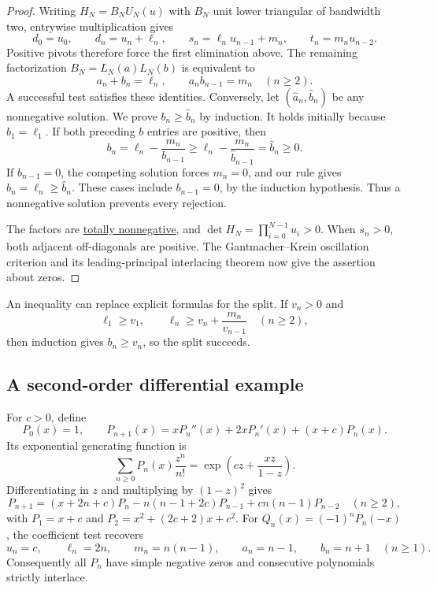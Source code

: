 \begin{proof}
Writing $H_N=B_NU_N(u)$ with $B_N$ unit lower triangular of bandwidth two,
entrywise multiplication gives
\[
 d_0=u_0,\qquad d_n=u_n+\ell_n,\qquad
 s_n=\ell_nu_{n-1}+m_n,\qquad t_n=m_nu_{n-2}.
\]
Positive pivots therefore force the first elimination above.
The remaining factorization $B_N=L_N(a)L_N(b)$ is equivalent to
\[
 a_n+b_n=\ell_n,\qquad a_nb_{n-1}=m_n\quad(n\geq2).
\]
A successful test satisfies these identities. Conversely, let
$(\widehat a_n,\widehat b_n)$ be any nonnegative solution.
We prove $b_n\geq\widehat b_n$ by induction. It holds initially because
$b_1=\ell_1$. If both preceding $b$ entries are positive, then
\[
 b_n=\ell_n-\frac{m_n}{b_{n-1}}
 \geq\ell_n-\frac{m_n}{\widehat b_{n-1}}=\widehat b_n\geq0.
\]
If $\widehat b_{n-1}=0$, the competing solution forces $m_n=0$,
and our rule gives $b_n=\ell_n\geq\widehat b_n$.
These cases include $b_{n-1}=0$, by the induction hypothesis.
Thus a nonnegative solution prevents every rejection.

The factors are \hyperref[totallyNonnegative]{totally nonnegative}, and
$\det H_N=\prod_{i=0}^{N-1}u_i>0$.
When $s_n>0$, both adjacent off-diagonals are positive. The
Gantmacher--Krein oscillation criterion and its leading-principal
interlacing theorem now give the assertion about zeros.
\end{proof}

An inequality can replace explicit formulas for the split. If $v_n>0$ and
\[
 \ell_1\geq v_1,\qquad
 \ell_n\geq v_n+\frac{m_n}{v_{n-1}}\quad(n\geq2),
\]
then induction gives $b_n\geq v_n$, so the split succeeds.

\subsection[interlacingSecondDerivativeExample]{A second-order differential example}

For $c>0$, define
\[
 P_0(x)=1,\qquad P_{n+1}(x)=xP_n''(x)+2xP_n'(x)+(x+c)P_n(x).
\]
Its exponential generating function is
\[
 \sum_{n\geq0}P_n(x)\frac{z^n}{n!}
 =\exp\left(cz+\frac{xz}{1-z}\right).
\]
Differentiating in $z$ and multiplying by $(1-z)^2$ gives
\[
 P_{n+1}=(x+2n+c)P_n-n(n-1+2c)P_{n-1}
             +cn(n-1)P_{n-2}\quad(n\geq2),
\]
with $P_1=x+c$ and $P_2=x^2+(2c+2)x+c^2$.
For $Q_n(x)=(-1)^nP_n(-x)$, the coefficient test recovers
\[
 u_n=c,\qquad \ell_n=2n,\qquad m_n=n(n-1),\qquad
 a_n=n-1,\qquad b_n=n+1\quad(n\geq1).
\]
Consequently all $P_n$ have simple negative zeros and consecutive
polynomials strictly interlace.

